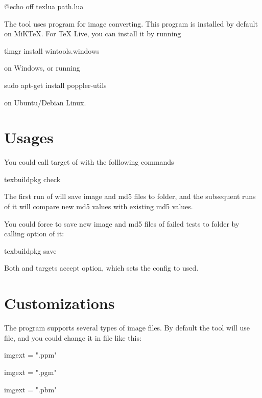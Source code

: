 \documentclass[oneside,12pt]{article}
\begin{document}
\begin{codehigh}
@echo off
texlua path\to\texbuildpkg.lua %
\end{codehigh}

The  tool uses  program for image converting.
This program is installed by default on MiKTeX. For TeX Live, you can install it by running
\begin{codehigh}
tlmgr install wintools.windows
\end{codehigh}
on Windows, or running
\begin{codehigh}
sudo apt-get install poppler-utils
\end{codehigh}
on Ubuntu/Debian Linux.

\section{Usages}

You could call  target of  with the folllowing commands
\begin{codehigh}
texbuildpkg check
\end{codehigh}

The first run of  will save image and md5 files to  folder,
and the subsequent runs of it will compare new md5 values with existing md5 values.

You could force  to save new image and md5 files of failed tests to
 folder by calling  option of it:
\begin{codehigh}
texbuildpkg save
\end{codehigh}

Both  and  targets accept  option, which sets the config to used.

\section{Customizations}

The  program supports several types of image files.
By default the  tool will use  file,
and you could change it in  file like this:
\begin{codehigh}
imgext = ".ppm"
\end{codehigh}
\begin{codehigh}
imgext = ".pgm"
\end{codehigh}
\begin{codehigh}
imgext = ".pbm"
\end{codehigh}
\end{document}
